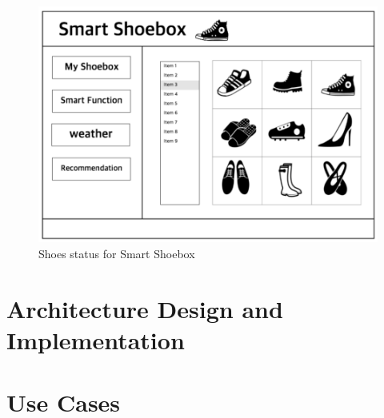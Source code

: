\documentclass[conference]{IEEEtran}
\begin{document}
\begin{figure}[htbp]
\begin{center}
    \includegraphics[scale=0.4]{UI5}
   \caption{Shoes status for Smart Shoebox}\label{fig:label}
\end{center}
\end{figure}

\section{Architecture Design and Implementation}
\section{Use Cases}






%
%
\end{document}
